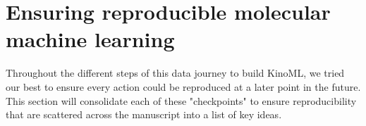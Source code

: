 \documentclass[9pt,lessons, pubversion]{livecoms}
\begin{document}

\section{Ensuring reproducible molecular machine learning}

Throughout the different steps of this data journey to build KinoML, we tried our best to ensure every action could be reproduced at a later point in the future. This section will consolidate each of these "checkpoints" to ensure reproducibility that are scattered across the manuscript into a list of key ideas.
\end{document}

